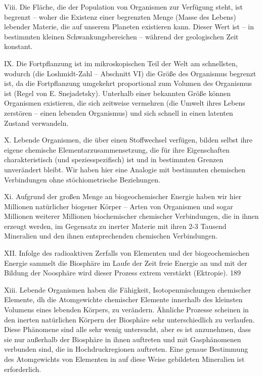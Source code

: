 \documentclass[11pt,a4paper]{book}
\begin{document}
Viii. Die Fläche, die der Population von Organismen zur Verfügung steht, ist begrenzt -- woher die Existenz einer begrenzten Menge (Masse des Lebens) lebender Materie, die auf unserem Planeten existieren kann. Dieser Wert ist -- in bestimmten kleinen Schwankungsbereichen -- während der geologischen Zeit konstant.



IX. Die Fortpflanzung ist im mikroskopischen Teil der Welt am schnellsten, wodurch (die Loshmidt-Zahl -- Abschnitt VI) die Größe des Organismus begrenzt ist, da die Fortpflanzung umgekehrt proportional zum Volumen des Organismus ist (Regel von E. Snejadetsky). Unterhalb einer bekannten Größe können Organismen existieren, die sich zeitweise vermehren (die Umwelt ihres Lebens zerstören -- einen lebenden Organismus) und sich schnell in einen latenten Zustand verwandeln.



X. Lebende Organismen, die über einen Stoffwechsel verfügen, bilden selbst ihre eigene chemische Elementarzusammensetzung, die für ihre Eigenschaften charakteristisch (und speziesspezifisch) ist und in bestimmten Grenzen unverändert bleibt. Wir haben hier eine Analogie mit bestimmten chemischen Verbindungen ohne stöchiometrische Beziehungen.



Xi. Aufgrund der großen Menge an biogeochemischer Energie haben wir hier Millionen natürlicher biogener Körper -- Arten von Organismen und sogar Millionen weiterer Millionen biochemischer chemischer Verbindungen, die in ihnen erzeugt werden, im Gegensatz zu inerter Materie mit ihren 2-3 Tausend Mineralien und den ihnen entsprechenden chemischen Verbindungen.



XII. Infolge des radioaktiven Zerfalls von Elementen und der biogeochemischen Energie sammelt die Biosphäre im Laufe der Zeit freie Energie an und mit der Bildung der Noosphäre wird dieser Prozess extrem verstärkt (Ektropie). 189



Xiii. Lebende Organismen haben die Fähigkeit, Isotopenmischungen chemischer Elemente, dh die Atomgewichte chemischer Elemente innerhalb des kleinsten Volumens eines lebenden Körpers, zu verändern. Ähnliche Prozesse scheinen in den inerten natürlichen Körpern der Biosphäre sehr unterschiedlich zu verlaufen. Diese Phänomene sind alle sehr wenig untersucht, aber es ist anzunehmen, dass sie nur außerhalb der Biosphäre in ihnen auftreten und mit Gasphänomenen verbunden sind, die in Hochdruckregionen auftreten. Eine genaue Bestimmung des Atomgewichts von Elementen in auf diese Weise gebildeten Mineralien ist erforderlich.
\end{document}
